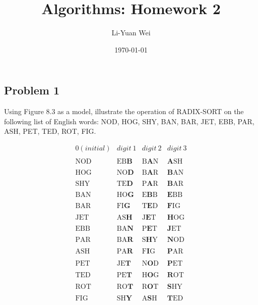 \documentclass[a4paper]{article}
\makeatletter
\newenvironment{solution}
  {\begin{proof}[Solution]}
  {\end{proof}}
\renewenvironment{proof}[1][\proofname]{%
  \par\pushQED{\qed}\normalfont%
  \topsep6\p@\@plus6\p@\relax
  \trivlist\item[\hskip\labelsep\bfseries#1\@addpunct{.}]%
  \ignorespaces
}{%
  \popQED\endtrivlist\@endpefalse
}
\makeatother
\begin{document}
\title{Algorithms: Homework 2}
\author{Li-Yuan Wei}
\date{\today}
\maketitle

\subsection*{Problem 1}
Using Figure 8.3 as a model, illustrate the operation of RADIX-SORT on the following list of English words: NOD, HOG, SHY, BAN, BAR, JET, EBB, PAR, ASH, PET, TED, ROT, FIG.
\begin{solution}
$$
\begin{array}{cccc}
0(initial)& digit\ 1 & digit\ 2 & digit\ 3 \\\\
\hline
\text{NOD} & \text{EB$\textbf{B}$} & \text{B$\textbf{A}$N} & \text{$\textbf{A}$SH} \\\\
\text{HOG} & \text{NO$\textbf{D}$} & \text{B$\textbf{A}$R} & \text{$\textbf{B}$AN} \\\\
\text{SHY} & \text{TE$\textbf{D}$} & \text{P$\textbf{A}$R} & \text{$\textbf{B}$AR} \\\\
\text{BAN} & \text{HO$\textbf{G}$} & \text{E$\textbf{B}$B} & \text{$\textbf{E}$BB} \\\\
\text{BAR} & \text{FI$\textbf{G}$} & \text{T$\textbf{E}$D} & \text{$\textbf{F}$IG} \\\\
\text{JET} & \text{AS$\textbf{H}$} & \text{J$\textbf{E}$T} & \text{$\textbf{H}$OG} \\\\
\text{EBB} & \text{BA$\textbf{N}$} & \text{P$\textbf{E}$T} & \text{$\textbf{J}$ET} \\\\
\text{PAR} & \text{BA$\textbf{R}$} & \text{S$\textbf{H}$Y} & \text{$\textbf{N}$OD} \\\\
\text{ASH} & \text{PA$\textbf{R}$} & \text{F$\textbf{I}$G} & \text{$\textbf{P}$AR} \\\\
\text{PET} & \text{JE$\textbf{T}$} & \text{N$\textbf{O}$D} & \text{$\textbf{P}$ET} \\\\
\text{TED} & \text{PE$\textbf{T}$} & \text{H$\textbf{O}$G} & \text{$\textbf{R}$OT} \\\\
\text{ROT} & \text{RO$\textbf{T}$} & \text{R$\textbf{O}$T} & \text{$\textbf{S}$HY} \\\\
\text{FIG} & \text{SH$\textbf{Y}$} & \text{A$\textbf{S}$H} & \text{$\textbf{T}$ED} \\\\
\end{array}
$$
\end{solution}
\end{document}
